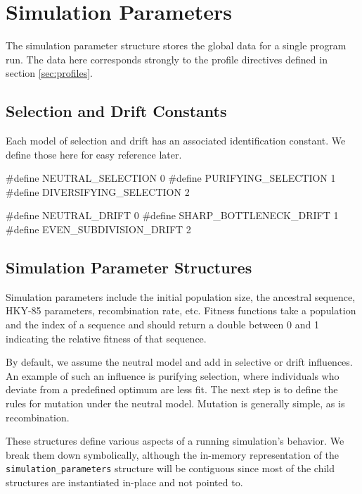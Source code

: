 \documentclass{article}
\begin{document}
  \section{Simulation Parameters}
    \label{sec:simulation-parameters}
    
    The simulation parameter structure stores the global data for a single
    program run. The data here corresponds strongly to the profile directives
    defined in section \ref{sec:profiles}.

    \subsection{Selection and Drift Constants}
      \label{sec:selection-drift-constants}

      Each model of selection and drift has an associated identification
      constant. We define those here for easy reference later.

\begin{ccode}
#define NEUTRAL_SELECTION 0
#define PURIFYING_SELECTION 1
#define DIVERSIFYING_SELECTION 2

#define NEUTRAL_DRIFT 0
#define SHARP_BOTTLENECK_DRIFT 1
#define EVEN_SUBDIVISION_DRIFT 2
\end{ccode}

    \subsection{Simulation Parameter Structures}
      \label{sec:full-simulation-parameters}

      Simulation parameters include the initial population size, the ancestral
      sequence, HKY-85 parameters, recombination rate, etc. Fitness functions
      take a population and the index of a sequence and should return a double
      between 0 and 1 indicating the relative fitness of that sequence.

      By default, we assume the neutral model and add in selective or drift
      influences. An example of such an influence is purifying selection, where
      individuals who deviate from a predefined optimum are less fit. The next
      step is to define the rules for mutation under the neutral model. Mutation
      is generally simple, as is recombination.

      These structures define various aspects of a running simulation's
      behavior. We break them down symbolically, although the in-memory
      representation of the \verb|simulation_parameters| structure will be
      contiguous since most of the child structures are instantiated in-place
      and not pointed to.
\end{document}

